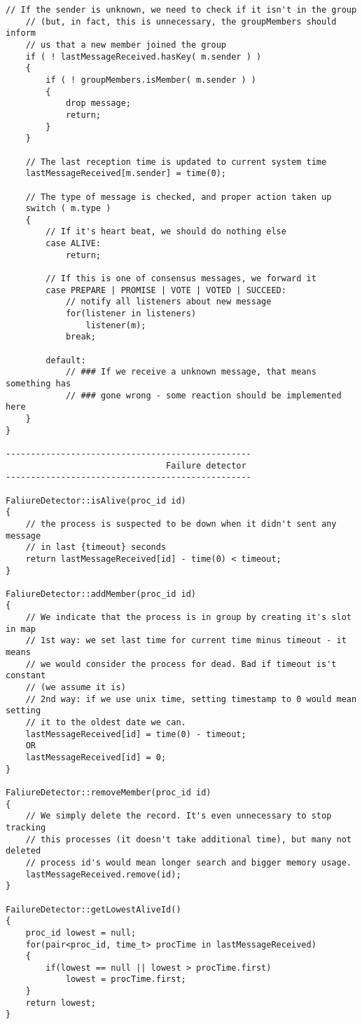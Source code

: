 {\begin{lstlisting}[frame=lines,caption=Pseudocode of Paxos algorithm]
	// If the sender is unknown, we need to check if it isn't in the group
	// (but, in fact, this is unnecessary, the groupMembers should inform
	// us that a new member joined the group
	if ( ! lastMessageReceived.hasKey( m.sender ) )
	{
		if ( ! groupMembers.isMember( m.sender ) )
		{
			drop message;
			return;
		}
	}

	// The last reception time is updated to current system time
	lastMessageReceived[m.sender] = time(0);

	// The type of message is checked, and proper action taken up
	switch ( m.type )
	{
		// If it's heart beat, we should do nothing else
		case ALIVE:
			return;

		// If this is one of consensus messages, we forward it
		case PREPARE | PROMISE | VOTE | VOTED | SUCCEED:
			// notify all listeners about new message
			for(listener in listeners)
				listener(m);
			break;
			
		default:
			// ### If we receive a unknown message, that means something has
			// ### gone wrong - some reaction should be implemented here
	}
}

-------------------------------------------------
							    Failure detector
-------------------------------------------------

FaliureDetector::isAlive(proc_id id)
{
	// the process is suspected to be down when it didn't sent any message
	// in last {timeout} seconds
	return lastMessageReceived[id] - time(0) < timeout;
}

FaliureDetector::addMember(proc_id id)
{
	// We indicate that the process is in group by creating it's slot in map
	// 1st way: we set last time for current time minus timeout - it means
	// we would consider the process for dead. Bad if timeout is't constant
	// (we assume it is)
	// 2nd way: if we use unix time, setting timestamp to 0 would mean setting
	// it to the oldest date we can.
	lastMessageReceived[id] = time(0) - timeout;
	OR
	lastMessageReceived[id] = 0;
}

FaliureDetector::removeMember(proc_id id)
{
	// We simply delete the record. It's even unnecessary to stop tracking
	// this processes (it doesn't take additional time), but many not deleted
	// process id's would mean longer search and bigger memory usage.
	lastMessageReceived.remove(id);
}

FailureDetector::getLowestAliveId()
{
	proc_id lowest = null;
	for(pair<proc_id, time_t> procTime in lastMessageReceived)
	{
		if(lowest == null || lowest > procTime.first)
			lowest = procTime.first;
	}
	return lowest;
}


\end{lstlisting}}
